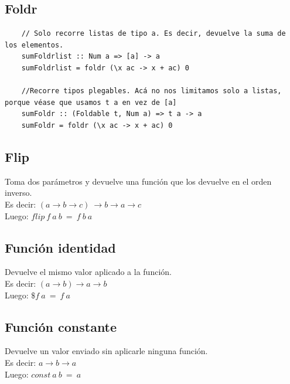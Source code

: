 \documentclass[10pt,a4paper]{article}
\begin{document}
\subsection*{Foldr}
\label{subsec:foldr_ex}
\begin{lstlisting}
    // Solo recorre listas de tipo a. Es decir, devuelve la suma de los elementos.
    sumFoldrlist :: Num a => [a] -> a 
    sumFoldrlist = foldr (\x ac -> x + ac) 0

    //Recorre tipos plegables. Acá no nos limitamos solo a listas, porque véase que usamos t a en vez de [a]
    sumFoldr :: (Foldable t, Num a) => t a -> a 
    sumFoldr = foldr (\x ac -> x + ac) 0
\end{lstlisting}
\subsection*{Flip}
Toma dos parámetros y devuelve una función que los devuelve en el orden inverso. \\
Es decir: $(a \rightarrow b \rightarrow c) \ \rightarrow b \rightarrow a \rightarrow c$ \\
Luego: $ flip \ f \ a \ b \ = \ f \ b \ a $
\subsection*{Función identidad}
Devuelve el mismo valor aplicado a la función. \\
Es decir: $(a  \rightarrow b)  \rightarrow a \rightarrow b$ \\
Luego: $ \$ f \ a \ = \ f \ a  $
\subsection*{Función constante}
Devuelve un valor enviado sin aplicarle ninguna función. \\
Es decir: $a \rightarrow b \rightarrow a$ \\
Luego: $const \ a \ b \ = \ a$
\end{document}
